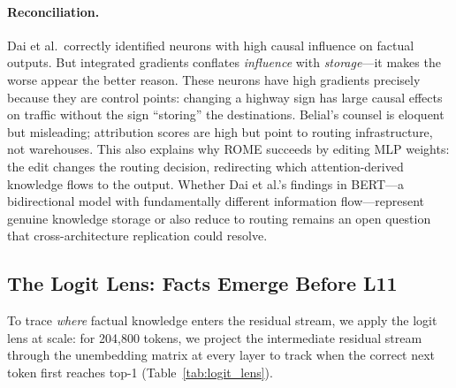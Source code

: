 \documentclass{article}
\begin{document}
\paragraph{Reconciliation.}
Dai et al.\ correctly identified neurons with high causal influence on factual
outputs.
But integrated gradients conflates \emph{influence} with \emph{storage}---it
makes the worse appear the better reason.
These neurons have high gradients precisely because they are control
points: changing a highway sign has large causal effects on traffic without the
sign ``storing'' the destinations.
Belial's counsel is eloquent but misleading; attribution scores are high but
point to routing infrastructure, not warehouses.
This also explains why ROME \citep{meng2022locating} succeeds by editing MLP
weights: the edit changes the routing decision, redirecting which
attention-derived knowledge flows to the output.
Whether Dai et al.'s findings in BERT---a bidirectional model with fundamentally
different information flow---represent genuine knowledge storage or also reduce
to routing remains an open question that cross-architecture replication could
resolve.

\subsection{The Logit Lens: Facts Emerge Before L11}

To trace \emph{where} factual knowledge enters the residual stream, we apply
the logit lens \citep{nostalgebraist2020logitlens} at scale: for 204,800 tokens,
we project the intermediate residual stream through the unembedding matrix at
every layer to track when the correct next token first reaches top-1
(Table~\ref{tab:logit_lens}).
\end{document}
